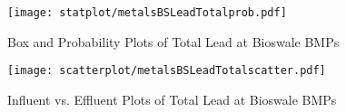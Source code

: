         \begin{figure}[hb]   %
            \centering
            \texttt{[image: statplot/metalsBSLeadTotalprob.pdf]}
            \caption{Box and Probability Plots of Total Lead at Bioswale BMPs}
        \end{figure}         %
        
        
        \begin{figure}[hb]   %
            \centering
            \texttt{[image: scatterplot/metalsBSLeadTotalscatter.pdf]}
            \caption{Influent vs. Effluent Plots of Total Lead at Bioswale BMPs}
        \end{figure}         %
        \clearpage
        